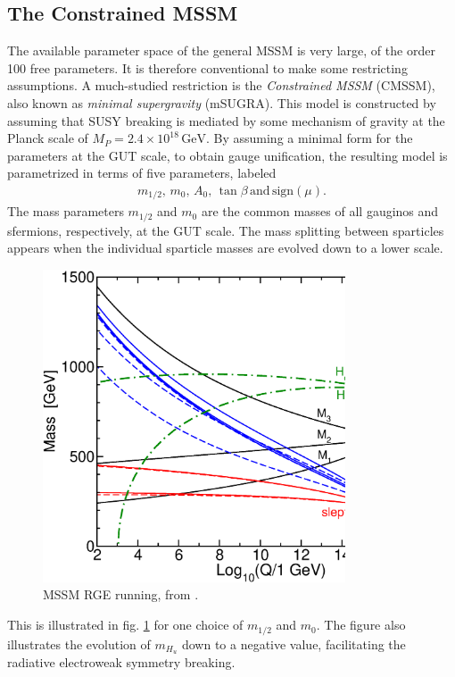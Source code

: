 \documentclass[twoside,english]{uiofysmaster}
\begin{document}
\subsection{The Constrained MSSM}
The available parameter space of the general MSSM is very large, of the order 100 free parameters. It is therefore conventional to make some restricting assumptions. A much-studied restriction is the {\it Constrained MSSM} (CMSSM), also known as {\it minimal supergravity} (mSUGRA). This model is constructed by assuming that SUSY breaking is mediated by some mechanism of gravity at the Planck scale of $M_P = 2.4\times 10^{18} \, \mathrm{GeV}$. By assuming a minimal form for the parameters at the GUT scale, to obtain gauge unification, the resulting model is parametrized in terms of five parameters, labeled
\begin{align}
	m_{1/2}, \, m_{0}, \, A_0, \, \tan\beta \, \mathrm{and} \, \mathrm{sign}(\mu).
\end{align}
The mass parameters $m_{1/2}$ and $m_0$ are the common masses of all gauginos and sfermions, respectively, at the GUT scale. The mass splitting between sparticles appears when the individual sparticle masses are evolved down to a lower scale.
\begin{figure}[hbt]
	\centering
	\includegraphics[width=0.8\textwidth]{figures/susyintro/MSSMrun.eps}
	\caption{MSSM RGE running, from \cite{Martin:1997ns}.}
	\label{fig:mssm_rgerun}
\end{figure}
This is illustrated in fig. \ref{fig:mssm_rgerun} for one choice of $m_{1/2}$ and $m_0$. The figure also illustrates the evolution of $m_{H_u}$ down to a negative value, facilitating the radiative electroweak symmetry breaking.
\end{document}
